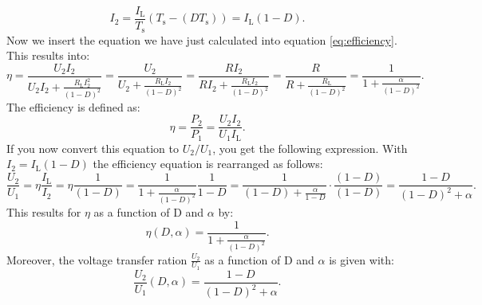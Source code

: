 \begin{solutionblock}
\begin{equation}
    I_\mathrm{2}= \frac{I_\mathrm{L}}{T_\mathrm{s}}(T_\mathrm{s}-(DT_\mathrm{s}))=I_\mathrm{L}(1-D).
\end{equation}
Now we insert the equation we have just calculated into equation \eqref{eq:efficiency}. This results into: 
\begin{equation}
    \eta=\frac{U_\mathrm{2}I_\mathrm{2}}{U_\mathrm{2}I_\mathrm{2}+\frac{ R_\mathrm{L}I_\mathrm{2}^2}{(1-D)^2}}=\frac{U_\mathrm{2}}{U_\mathrm{2}+\frac{ R_\mathrm{L}I_\mathrm{2}}{(1-D)^2}}=\frac{RI_\mathrm{2}}{RI_\mathrm{2}+\frac{ R_\mathrm{L}I_\mathrm{2}}{(1-D)^2}}=\frac{R}{R+\frac{ R_\mathrm{L}}{(1-D)^2}}=\frac{1}{1+\frac{\alpha}{(1-D)^2}}.
    \label{eq:efficiencyOverD}
\end{equation}
The efficiency is defined as:
\begin{equation}
    \eta=\frac{P_\mathrm{2}}{P_\mathrm{1}} = \frac{U_\mathrm{2}I_\mathrm{2}}{U_\mathrm{1}I_\mathrm{L}}.
\end{equation}
If you now convert this equation to $U_\mathrm{2}/U_\mathrm{1}$, you get the following expression. With $I_\mathrm{2}=I_\mathrm{L}(1-D)$ the efficiency equation is rearranged as follows:
\begin{equation}
    \frac{U_\mathrm{2}}{U_\mathrm{1}}=\eta \frac{I_\mathrm{L}}{I_\mathrm{2}}= \eta \frac{1}{(1-D)}=\frac{1}{1+\frac{\alpha}{(1-D)^2}}\frac{1}{1-D}=\frac{1}{(1-D)+\frac{\alpha}{1-D}}\cdot \frac{(1-D)}{(1-D)}=\frac{1-D}{(1-D)^2+\alpha}.
    \label{eq:voltageRatioOverD}
\end{equation}
This results for $\eta$ as a function of D and $\alpha$ by:
\begin{equation}
    \eta(D,\alpha)=\frac{1}{1+\frac{\alpha}{(1-D)^2}}.
\end{equation}
Moreover, the voltage transfer ration $\frac{U_\mathrm{2}}{U_\mathrm{1}}$ as a function of D and $\alpha$ is given with:
\begin{equation}
    \frac{U_\mathrm{2}}{U_\mathrm{1}}(D,\alpha)=\frac{1-D}{(1-D)^2+\alpha}.
\end{equation}
\end{solutionblock}

